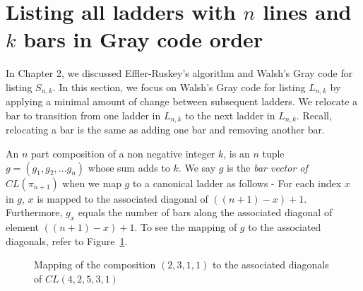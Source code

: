 \section{Listing all ladders with $n$ lines and $k$ bars in Gray code order}
 In Chapter 2, we discussed Effler-Ruskey's algorithm and Walsh's Gray code for listing $S_{n,k}$. 
In this section, we focus on Walsh's Gray code for listing $L_{n,k}$ by applying a minimal amount of change between subsequent ladders. We 
relocate a bar to transition from one ladder in $L_{n,k}$ to the next ladder in $L_{n,k}$. Recall, relocating a bar is the same as 
adding one bar and removing another bar.\par  
An $n$ part composition of a non negative integer $k$, is an $n$ tuple $g=(g_{1}, g_{2}, \dots g_{n})$ whose sum adds to $k$. We 
say $g$ is the \emph{bar vector of $CL(\pi_{n+1})$} when we map $g$ to a canonical ladder as follows - For each 
index $x$ in $g$, $x$ is mapped to the associated diagonal of $((n+1)-x) + 1$. Furthermore, $g_{x}$ equals the number of bars along the associated 
diagonal of element $((n+1)-x) + 1$. To see the mapping of $g$ to the associated diagonals, refer to Figure~\ref{Fig:gToLadder}.\par 
\begin{figure}
  \centering
  \caption{Mapping of the composition $(2,3,1,1)$ to the associated diagonals of $CL(4,2,5,3,1)$}
  \label{Fig:gToLadder}
\end{figure}
